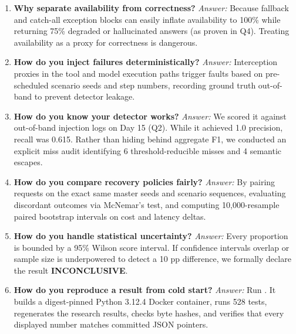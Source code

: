 \begin{enumerate}
    \item \textbf{Why separate availability from correctness?}
    \newline \textit{Answer:} Because fallback and catch-all exception blocks can easily inflate availability to 100\% while returning 75\% degraded or hallucinated answers (as proven in Q4). Treating availability as a proxy for correctness is dangerous.

    \item \textbf{How do you inject failures deterministically?}
    \newline \textit{Answer:} Interception proxies in the tool and model execution paths trigger faults based on pre-scheduled scenario seeds and step numbers, recording ground truth out-of-band to prevent detector leakage.

    \item \textbf{How do you know your detector works?}
    \newline \textit{Answer:} We scored it against out-of-band injection logs on Day 15 (Q2). While it achieved 1.0 precision, recall was 0.615. Rather than hiding behind aggregate F1, we conducted an explicit miss audit identifying 6 threshold-reducible misses and 4 semantic escapes.

    \item \textbf{How do you compare recovery policies fairly?}
    \newline \textit{Answer:} By pairing requests on the exact same master seeds and scenario sequences, evaluating discordant outcomes via McNemar's test, and computing 10,000-resample paired bootstrap intervals on cost and latency deltas.

    \item \textbf{How do you handle statistical uncertainty?}
    \newline \textit{Answer:} Every proportion is bounded by a 95\% Wilson score interval. If confidence intervals overlap or sample size is underpowered to detect a 10 pp difference, we formally declare the result \textbf{INCONCLUSIVE}.

    \item \textbf{How do you reproduce a result from cold start?}
    \newline \textit{Answer:} Run . It builds a digest-pinned Python 3.12.4 Docker container, runs 528 tests, regenerates the research results, checks byte hashes, and verifies that every displayed number matches committed JSON pointers.


\end{enumerate}
